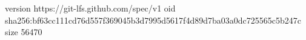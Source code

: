 version https://git-lfs.github.com/spec/v1
oid sha256:bf63cc111cd76d557f369045b3d7995d5617f4d89d7ba03a0dc725565c5b247c
size 56470

